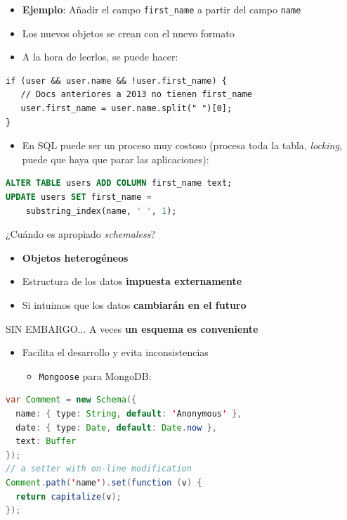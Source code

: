\documentclass[14pt]{beamer}
\begin{document}
\begin{frame}
\framebreak

\begin{itemize}
\item {\bf Ejemplo}: Añadir el campo {\tt first\_name} a partir del campo
  {\tt name}
\item Los nuevos objetos se crean con el nuevo formato
\item A la hora de leerlos, se puede hacer:
\end{itemize}
\begin{lstlisting}
if (user && user.name && !user.first_name) {
   // Docs anteriores a 2013 no tienen first_name
   user.first_name = user.name.split(" ")[0];
}
\end{lstlisting}

\framebreak

\begin{itemize}
\item En SQL puede ser un proceso muy costoso (procesa toda la tabla, {\em
    locking\/}, puede que haya que parar las aplicaciones):
\end{itemize}
\begin{lstlisting}[language=SQL]
ALTER TABLE users ADD COLUMN first_name text;
UPDATE users SET first_name =
    substring_index(name, ' ', 1);
\end{lstlisting}

\framebreak

\begin{block}{¿Cuándo es apropiado {\em schemaless}?}
  \begin{itemize}
  \item {\bf Objetos heterogéneos}
\item Estructura de los datos {\bf impuesta externamente}
\item Si intuimos que los datos {\bf cambiarán en el futuro}
  \end{itemize}
\end{block}


\framebreak

\begin{block}{SIN EMBARGO...}
 A veces {\bf un esquema es conveniente}
\begin{itemize}
\item Facilita el desarrollo y evita inconsistencias
  \begin{itemize}
  \item {\tt Mongoose} para MongoDB:
  \end{itemize}
\end{itemize}
\begin{lstlisting}[language=Java]
var Comment = new Schema({
  name: { type: String, default: 'Anonymous' },
  date: { type: Date, default: Date.now },
  text: Buffer
});
// a setter with on-line modification
Comment.path('name').set(function (v) {
  return capitalize(v);
});
\end{lstlisting}
\end{block}
\end{frame}
\end{document}
